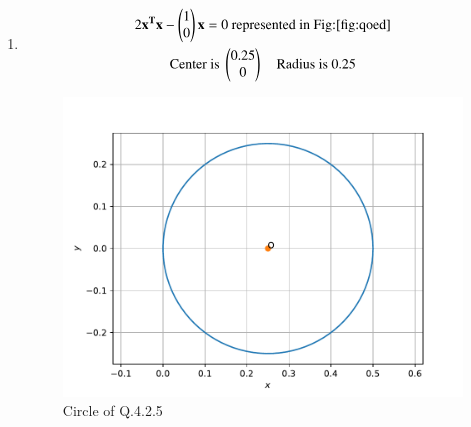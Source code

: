 \begin{enumerate}[label=\thesection.\arabic*.,ref=\thesection.\theenumi]
\begin{enumerate}
\item \begin{multline} 
2\mathbf{x^Tx} - \begin{pmatrix}1\\0\end{pmatrix}\mathbf{x} = 0\text{ represented in Fig:\ref{fig:qoed}}
\\
\text{Center is }\begin{pmatrix}0.25\\0\end{pmatrix}\quad\text{Radius is }0.25
\end{multline}
	\begin{figure}[!ht]
	\centering
	\includegraphics[width=\columnwidth]{./figs/circle/q18d.pdf}
	\caption{Circle of Q.4.2.5}
	\label{fig:qoed}	
	\end{figure}



\end{enumerate}
\end{enumerate}
